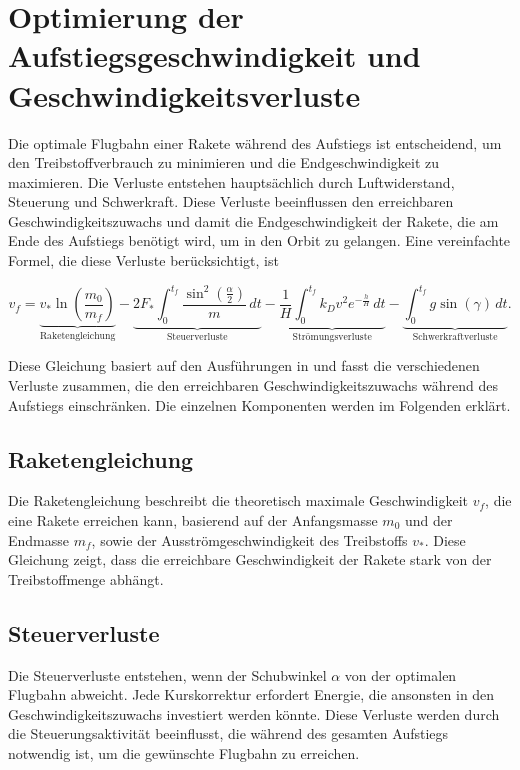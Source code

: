 %
%
%
%

\section{Optimierung der Aufstiegsgeschwindigkeit und Geschwindigkeitsverluste \label{leo:section:aufstiegsgleichung}}

Die optimale Flugbahn einer Rakete während des Aufstiegs ist entscheidend, um den Treibstoffverbrauch zu minimieren und die Endgeschwindigkeit zu maximieren. 
Die Verluste entstehen hauptsächlich durch Luftwiderstand, Steuerung und Schwerkraft. 
Diese Verluste beeinflussen den erreichbaren Geschwindigkeitszuwachs und damit die Endgeschwindigkeit der Rakete, die am Ende des Aufstiegs benötigt wird, um in den Orbit zu gelangen. 
Eine vereinfachte Formel, die diese Verluste berücksichtigt, ist

\begin{equation}
	v_f = \underbrace{v_* \ln \left(\frac{m_0}{m_f}\right)}_{\text{Raketengleichung}} 
	- \underbrace{2F_* \int_0^{t_f} \frac{\sin^2\left(\frac{\alpha}{2}\right)}{m} \, dt }_{\text{Steuerverluste}}
	- \underbrace{\frac{1}{H} \int_0^{t_f} k_Dv^2 e^{-\frac{h}{H}} \, dt }_{\text{Strömungsverluste}}
	- \underbrace{\int_0^{t_f} g \sin \left(\gamma\right) \, dt}_{\text{Schwerkraftverluste}}.
	\label{leo:aufstiegsgleichung}
\end{equation}

Diese Gleichung basiert auf den Ausführungen in \cite{leo:astronautics} und fasst die verschiedenen Verluste zusammen, die den erreichbaren Geschwindigkeitszuwachs während des Aufstiegs einschränken. 
Die einzelnen Komponenten werden im Folgenden erklärt.

\subsection{Raketengleichung}
Die Raketengleichung beschreibt die theoretisch maximale Geschwindigkeit \(v_f\), die eine Rakete erreichen kann, basierend auf der Anfangsmasse \(m_0\) und der Endmasse \(m_f\), sowie der Ausströmgeschwindigkeit des Treibstoffs \(v_*\). 
Diese Gleichung zeigt, dass die erreichbare Geschwindigkeit der Rakete stark von der Treibstoffmenge abhängt.

\subsection{Steuerverluste}
Die Steuerverluste entstehen, wenn der Schubwinkel \(\alpha\) von der optimalen Flugbahn abweicht. 
Jede Kurskorrektur erfordert Energie, die ansonsten in den Geschwindigkeitszuwachs investiert werden könnte. 
Diese Verluste werden durch die Steuerungsaktivität beeinflusst, die während des gesamten Aufstiegs notwendig ist, um die gewünschte Flugbahn zu erreichen.

